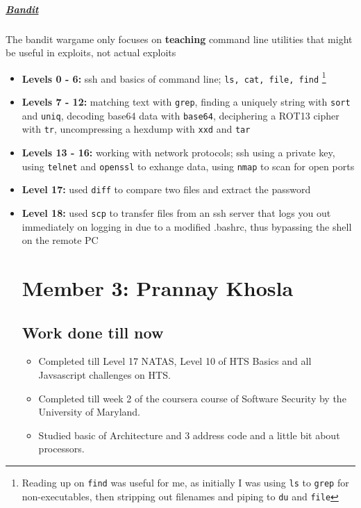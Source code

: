 \documentclass{article}
\def\code#1{\texttt{#1}}
\begin{document}
\paragraph{}
\subparagraph{\href{http://overthewire.org/wargames/bandit/}{Bandit}}
The bandit wargame only focuses on \textbf{teaching} command line utilities that might be useful in exploits, not actual exploits
\begin{itemize}
    
    \item \textbf{Levels 0 - 6: } ssh and basics of command line; \code{ls, cat, file, find} \footnote{Reading up on \code{find} was useful for me, as initially I was using \code{ls} to \code{grep} for non-executables, then stripping out filenames and piping to \code{du} and \code{file}}
    
    \item \textbf{Levels 7 - 12: } matching text with \code{grep}, finding a uniquely string with \code{sort} and \code{uniq}, decoding base64 data with \code{base64}, deciphering a ROT13 cipher with \code{tr}, uncompressing a hexdump with \code{xxd} and \code{tar}
    
    \item \textbf{Levels 13 - 16: } working with network protocols; ssh using a private key, using \code{telnet} and \code{openssl} to exhange data, using \code{nmap} to scan for open ports
    
    \item \textbf{Level 17: } used \code{diff} to compare two files and extract the password
    
    \item \textbf{Level 18: } used \code{scp} to transfer files from an ssh server that logs you out immediately on logging in due to a modified .bashrc, thus bypassing the shell on the remote PC

\newpage
\section*{Member 3: Prannay Khosla}
\subsection*{Work done till now}
\begin{itemize}
	\item Completed till Level 17 NATAS, Level 10 of HTS Basics and all Javsascript challenges on HTS.
	\item Completed till week 2 of the coursera course of Software Security by the  University of Maryland. 
	\item Studied basic of Architecture and 3 address code and a little bit about processors.
\end{itemize}

\end{itemize}
\end{document}
